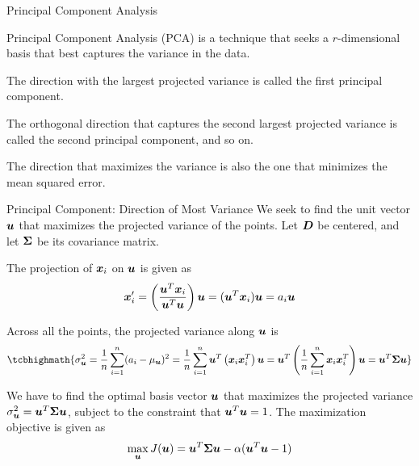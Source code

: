 \ifdefined\wox \begin{frame} \titlepage \end{frame} \fi

\begin{frame}{Principal Component Analysis}

Principal Component Analysis (PCA) is a technique that
seeks a $r$-dimensional basis that best captures the
variance in the data.

\medskip
The direction with the largest projected variance is called
the f\/{i}rst principal component.

\medskip
The orthogonal direction that captures
the second largest projected variance is called the second principal component,
and so on. 

\medskip
The direction that maximizes the
variance is also the one that minimizes the mean squared
error.
\end{frame}





\begin{frame}{Principal Component: Direction of Most Variance}
We seek to find the unit vector ${\boldsymbol u}$ that maximizes the projected
variance of the points. Let ${\boldsymbol D}$ be centered, and let ${\bm \Sigma}$ be its
covariance matrix.

\medskip
The projection of ${\boldsymbol x}_i$ on ${\boldsymbol u}$ is given as
\begin{align*}
  {\boldsymbol x}_i' =
  \left(\frac{{\boldsymbol u}^T {\boldsymbol x}_i}{{\boldsymbol u}^T{\boldsymbol u}}\right) {\boldsymbol u} = ({\boldsymbol u}^T {\boldsymbol x}_i) {\boldsymbol u} =
  a_i {\boldsymbol u}
\end{align*}

\medskip
Across all the points, the 
projected variance along ${\boldsymbol u}$ is
\begin{align*}
\tcbhighmath{
  \sigma^2_\bu  
  = \frac{1}{n}\sum_{i=1}^n (a_i-\mu_\bu)^2 
  = \frac{1}{n} \sum_{i=1}^n \bu^T \lB(\bx_{i}\bx_i^T\rB) \bu
   =  \bu^T \lB(\frac{1}{n}\sum_{i=1}^n \bx_i\bx_i^T\rB) \bu
  =  \bu^T \cov \bu
}
\end{align*}


\medskip
We have to find the
optimal basis vector ${\boldsymbol u}$ that maximizes the projected variance 
$\sigma^2_{\boldsymbol u} = {\boldsymbol u}^T {\bm \Sigma} {\boldsymbol u}$, subject to the 
constraint that ${\boldsymbol u}^T{\boldsymbol u}=1$. The maximization objective is given as
\begin{align*}
  \max_{\boldsymbol u} J({\boldsymbol u}) = 
  {\boldsymbol u}^T {\bm \Sigma} {\boldsymbol u} - \alpha ({\boldsymbol u}^T{\boldsymbol u}-1)
\end{align*}

\end{frame}


